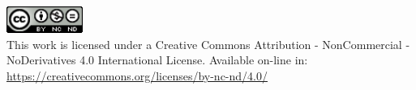 \newpage
\noindent
\includegraphics[width=2.5cm]{source/images/copyright}\\
This work is licensed under a Creative Commons Attribution - NonCommercial - NoDerivatives 4.0 International License. 
Available on-line in: \href{https://creativecommons.org/licenses/by-nc-nd/4.0/}{https://creativecommons.org/licenses/by-nc-nd/4.0/}

\newpage
\null

